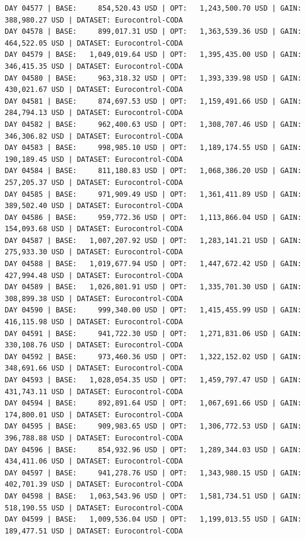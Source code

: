 \documentclass[11pt,a4paper]{article}
\begin{document}
\begin{verbatim}
DAY 04577 | BASE:     854,520.43 USD | OPT:   1,243,500.70 USD | GAIN: 388,980.27 USD | DATASET: Eurocontrol-CODA
DAY 04578 | BASE:     899,017.31 USD | OPT:   1,363,539.36 USD | GAIN: 464,522.05 USD | DATASET: Eurocontrol-CODA
DAY 04579 | BASE:   1,049,019.64 USD | OPT:   1,395,435.00 USD | GAIN: 346,415.35 USD | DATASET: Eurocontrol-CODA
DAY 04580 | BASE:     963,318.32 USD | OPT:   1,393,339.98 USD | GAIN: 430,021.67 USD | DATASET: Eurocontrol-CODA
DAY 04581 | BASE:     874,697.53 USD | OPT:   1,159,491.66 USD | GAIN: 284,794.13 USD | DATASET: Eurocontrol-CODA
DAY 04582 | BASE:     962,400.63 USD | OPT:   1,308,707.46 USD | GAIN: 346,306.82 USD | DATASET: Eurocontrol-CODA
DAY 04583 | BASE:     998,985.10 USD | OPT:   1,189,174.55 USD | GAIN: 190,189.45 USD | DATASET: Eurocontrol-CODA
DAY 04584 | BASE:     811,180.83 USD | OPT:   1,068,386.20 USD | GAIN: 257,205.37 USD | DATASET: Eurocontrol-CODA
DAY 04585 | BASE:     971,909.49 USD | OPT:   1,361,411.89 USD | GAIN: 389,502.40 USD | DATASET: Eurocontrol-CODA
DAY 04586 | BASE:     959,772.36 USD | OPT:   1,113,866.04 USD | GAIN: 154,093.68 USD | DATASET: Eurocontrol-CODA
DAY 04587 | BASE:   1,007,207.92 USD | OPT:   1,283,141.21 USD | GAIN: 275,933.30 USD | DATASET: Eurocontrol-CODA
DAY 04588 | BASE:   1,019,677.94 USD | OPT:   1,447,672.42 USD | GAIN: 427,994.48 USD | DATASET: Eurocontrol-CODA
DAY 04589 | BASE:   1,026,801.91 USD | OPT:   1,335,701.30 USD | GAIN: 308,899.38 USD | DATASET: Eurocontrol-CODA
DAY 04590 | BASE:     999,340.00 USD | OPT:   1,415,455.99 USD | GAIN: 416,115.98 USD | DATASET: Eurocontrol-CODA
DAY 04591 | BASE:     941,722.30 USD | OPT:   1,271,831.06 USD | GAIN: 330,108.76 USD | DATASET: Eurocontrol-CODA
DAY 04592 | BASE:     973,460.36 USD | OPT:   1,322,152.02 USD | GAIN: 348,691.66 USD | DATASET: Eurocontrol-CODA
DAY 04593 | BASE:   1,028,054.35 USD | OPT:   1,459,797.47 USD | GAIN: 431,743.11 USD | DATASET: Eurocontrol-CODA
DAY 04594 | BASE:     892,891.64 USD | OPT:   1,067,691.66 USD | GAIN: 174,800.01 USD | DATASET: Eurocontrol-CODA
DAY 04595 | BASE:     909,983.65 USD | OPT:   1,306,772.53 USD | GAIN: 396,788.88 USD | DATASET: Eurocontrol-CODA
DAY 04596 | BASE:     854,932.96 USD | OPT:   1,289,344.03 USD | GAIN: 434,411.06 USD | DATASET: Eurocontrol-CODA
DAY 04597 | BASE:     941,278.76 USD | OPT:   1,343,980.15 USD | GAIN: 402,701.39 USD | DATASET: Eurocontrol-CODA
DAY 04598 | BASE:   1,063,543.96 USD | OPT:   1,581,734.51 USD | GAIN: 518,190.55 USD | DATASET: Eurocontrol-CODA
DAY 04599 | BASE:   1,009,536.04 USD | OPT:   1,199,013.55 USD | GAIN: 189,477.51 USD | DATASET: Eurocontrol-CODA

\end{verbatim}
\end{document}
